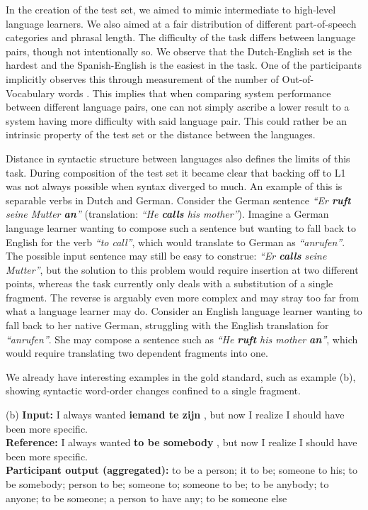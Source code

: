 In the creation of the test set, we aimed to mimic intermediate to high-level
language learners. We also aimed at a fair distribution of different
part-of-speech categories and phrasal length. The difficulty of the task
differs between language pairs, though not intentionally so. We observe that
the Dutch-English set is the hardest and the Spanish-English is the easiest in
the task. One of the participants implicitly observes this through measurement
of the number of Out-of-Vocabulary words \cite{CNRC}. This implies that when
comparing system performance between different language pairs, one can not
simply ascribe a lower result to a system having more difficulty with said
language pair. This could rather be an intrinsic property of the test set or
the distance between the languages.

Distance in syntactic structure between languages also defines the limits of
this task. During composition of the test set it became clear that backing off
to L1 was not always possible when syntax diverged to much. An example of this
is separable verbs in Dutch and German. Consider the German sentence \emph{``Er
\textbf{ruft} seine Mutter \textbf{an}''} (translation: \emph{``He
\textbf{calls} his mother''}). Imagine a German language learner wanting to
compose such a sentence but wanting to fall back to English for the verb
\emph{``to call''}, which would translate to German as \emph{``anrufen''}. The
possible input sentence may still be easy to construe: \emph{``Er
\textbf{calls} seine Mutter''}, but the solution to this problem would require
insertion at two different points, whereas the task currently only deals with a
substitution of a single fragment. The reverse is arguably even more complex
and may stray too far from what a language learner may do. Consider an English
language learner wanting to fall back to her native German, struggling with the
English translation for \emph{``anrufen''}. She may compose a sentence such as
\emph{``He \textbf{ruft} his mother \textbf{an}''}, which would require
translating two dependent fragments into one.

We already have interesting examples in the gold standard, such as example (b),
showing syntactic word-order changes confined to a single fragment.

\begin{examples}
\footnotesize
\item[(b)] \textbf{Input:} I always wanted \textbf{iemand te zijn} , but now I realize I should have been more specific.\\
\textbf{Reference:} I always wanted \textbf{to be somebody} , but now I realize I should have been more specific.\\
\textbf{Participant output (aggregated):} to be a person; it to be; someone to his; to be somebody; person to be; someone to; someone to be; to be anybody; to anyone; to be someone; a person to have any; to be someone else
\end{examples}

